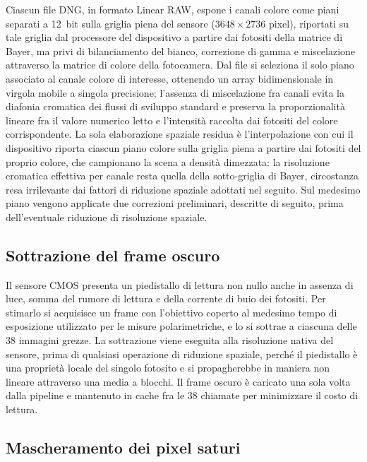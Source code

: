 Ciascun file DNG, in formato Linear RAW, espone i canali colore come piani separati a 12~bit sulla griglia piena del sensore ($3648 \times 2736$ pixel), riportati su tale griglia dal processore del dispositivo a partire dai fotositi della matrice di Bayer, ma privi di bilanciamento del bianco, correzione di gamma e miscelazione attraverso la matrice di colore della fotocamera. Dal file si seleziona il solo piano associato al canale colore di interesse, ottenendo un array bidimensionale in virgola mobile a singola precisione; l'assenza di miscelazione fra canali evita la diafonia cromatica dei flussi di sviluppo standard e preserva la proporzionalità lineare fra il valore numerico letto e l'intensità raccolta dai fotositi del colore corrispondente. La sola elaborazione spaziale residua è l'interpolazione con cui il dispositivo riporta ciascun piano colore sulla griglia piena a partire dai fotositi del proprio colore, che campionano la scena a densità dimezzata: la risoluzione cromatica effettiva per canale resta quella della sotto-griglia di Bayer, circostanza resa irrilevante dai fattori di riduzione spaziale adottati nel seguito. Sul medesimo piano vengono applicate due correzioni preliminari, descritte di seguito, prima dell'eventuale riduzione di risoluzione spaziale.

\subsection{Sottrazione del frame oscuro}
\label{subsec:dark_frame}

Il sensore CMOS presenta un piedistallo di lettura non nullo anche in assenza di luce, somma del rumore di lettura e della corrente di buio dei fotositi. Per stimarlo si acquisisce un frame con l'obiettivo coperto al medesimo tempo di esposizione utilizzato per le misure polarimetriche, e lo si sottrae a ciascuna delle 38 immagini grezze. La sottrazione viene eseguita alla risoluzione nativa del sensore, prima di qualsiasi operazione di riduzione spaziale, perché il piedistallo è una proprietà locale del singolo fotosito e si propagherebbe in maniera non lineare attraverso una media a blocchi. Il frame oscuro è caricato una sola volta dalla pipeline e mantenuto in cache fra le 38 chiamate per minimizzare il costo di lettura.

\subsection{Mascheramento dei pixel saturi}
\label{subsec:saturazione}

